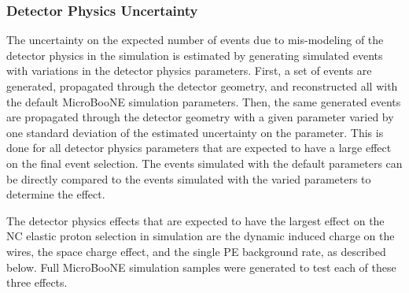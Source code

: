   \subsubsection{Detector Physics Uncertainty}\label{sec:detvar}
    The uncertainty on the expected number of events due to mis-modeling of the
    detector physics in the simulation is estimated by generating simulated
    events with variations in the detector physics parameters. First, a set of
    events are generated, propagated through the detector geometry, and
    reconstructed all with the default MicroBooNE simulation parameters. Then,
    the same generated events are propagated through the detector geometry with
    a given parameter varied by one standard deviation of the estimated
    uncertainty on the parameter. This is done for all detector physics
    parameters that are expected to have a large effect on the final event
    selection. The events simulated with the default parameters can be directly
    compared to the events simulated with the varied parameters to determine
    the effect. 
    
    The detector physics effects that are expected to have the largest effect
    on the NC elastic proton selection in simulation are the dynamic induced
    charge on the wires, the space charge effect, and the single PE background
    rate, as described below. Full MicroBooNE simulation samples were generated
    to test each of these three effects. 

